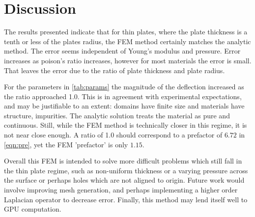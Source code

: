 \documentclass[12pt,times,twocolumn,3p]{elsarticle}
\begin{document}
\section{Discussion} \label{sec:disc}
The results presented indicate that for thin plates, where the plate thickness is
a tenth or less of the plates radius, the FEM method certainly matches the analytic
method. The error seems independent of Young's modulus and pressure. Error increases
as poison's ratio increases, however for most materials the error is small. That
leaves the error due to the ratio of plate thickness and plate radius.

For the parameters in \cref{tab:params} the magnitude of the deflection increased
as the ratio approached 1.0. This is in agreement with experimental expectations,
and may be justifiable to an extent: domains have finite size and materials have
structure, impurities. The analytic solution treats the material as pure and
continuous. Still, while the FEM method is technically closer in this regime, it
is not near close enough. A ratio of 1.0 should correspond to a prefactor of
$6.72$ in \cref{eqn:pre}, yet the FEM 'prefactor' is only $1.15$.

Overall this FEM is intended to solve more difficult problems which still fall
in the thin plate regime, such as non-uniform thickness or a varying pressure
across the surface or perhaps holes which are not aligned to origin. Future
work would involve improving mesh generation, and perhaps implementing a
higher order Laplacian operator to decrease error. Finally, this method may
lend itself well to GPU computation.



 

\end{document}
